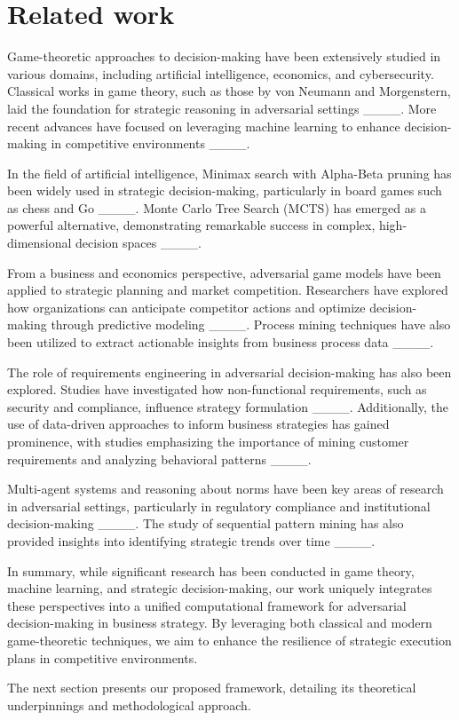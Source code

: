 \section{Related work}
Game-theoretic approaches to decision-making have been extensively studied in various domains, including artificial intelligence, economics, and cybersecurity. Classical works in game theory, such as those by von Neumann and Morgenstern, laid the foundation for strategic reasoning in adversarial settings ____. More recent advances have focused on leveraging machine learning to enhance decision-making in competitive environments ____.

In the field of artificial intelligence, Minimax search with Alpha-Beta pruning has been widely used in strategic decision-making, particularly in board games such as chess and Go ____. Monte Carlo Tree Search (MCTS) has emerged as a powerful alternative, demonstrating remarkable success in complex, high-dimensional decision spaces ____.

From a business and economics perspective, adversarial game models have been applied to strategic planning and market competition. Researchers have explored how organizations can anticipate competitor actions and optimize decision-making through predictive modeling ____. Process mining techniques have also been utilized to extract actionable insights from business process data ____.

The role of requirements engineering in adversarial decision-making has also been explored. Studies have investigated how non-functional requirements, such as security and compliance, influence strategy formulation ____. Additionally, the use of data-driven approaches to inform business strategies has gained prominence, with studies emphasizing the importance of mining customer requirements and analyzing behavioral patterns ____.

Multi-agent systems and reasoning about norms have been key areas of research in adversarial settings, particularly in regulatory compliance and institutional decision-making ____. The study of sequential pattern mining has also provided insights into identifying strategic trends over time ____.

In summary, while significant research has been conducted in game theory, machine learning, and strategic decision-making, our work uniquely integrates these perspectives into a unified computational framework for adversarial decision-making in business strategy. By leveraging both classical and modern game-theoretic techniques, we aim to enhance the resilience of strategic execution plans in competitive environments.

The next section presents our proposed framework, detailing its theoretical underpinnings and methodological approach.